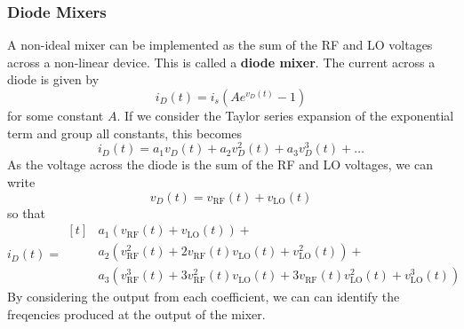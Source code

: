 \documentclass{article}
\begin{document}
\subsubsection{Diode Mixers}
A non-ideal mixer can be implemented as the sum of the RF and LO
voltages across a non-linear device. This is called a \textbf{diode
mixer}. The current across a diode is given by
\begin{equation*}
    i_D\left( t \right) = i_s \left( A e^{v_D\left( t \right)} - 1 \right)
\end{equation*}
for some constant \(A\). If we consider the Taylor series expansion of
the exponential term and group all constants, this becomes
\begin{equation*}
    i_D\left( t \right) = a_1 v_D\left( t \right) + a_2 v_D^2\left( t \right) + a_3 v_D^3\left( t \right) + \ldots
\end{equation*}
As the voltage across the diode is the sum of the RF and LO voltages,
we can write
\begin{equation*}
    v_D\left( t \right) = v_{\mathrm{RF}}\left( t \right) + v_{\mathrm{LO}}\left( t \right)
\end{equation*}
so that
\begin{equation*}
    i_D\left( t \right) =
    \begin{aligned}[t]
         & a_1 \left( v_{\mathrm{RF}}\left( t \right) + v_{\mathrm{LO}}\left( t \right) \right) +                                                                                                                                               \\
         & a_2 \left( v_{\mathrm{RF}}^2\left( t \right) + 2 v_{\mathrm{RF}}\left( t \right) v_{\mathrm{LO}}\left( t \right) + v_{\mathrm{LO}}^2\left( t \right) \right) +                                                                       \\
         & a_3 \left( v_{\mathrm{RF}}^3\left( t \right) + 3 v_{\mathrm{RF}}^2\left( t \right) v_{\mathrm{LO}}\left( t \right) + 3 v_{\mathrm{RF}}\left( t \right) v_{\mathrm{LO}}^2\left( t \right) + v_{\mathrm{LO}}^3\left( t \right) \right)
    \end{aligned}
\end{equation*}
By considering the output from each coefficient, we can can identify the
freqencies produced at the output of the mixer.
\end{document}
